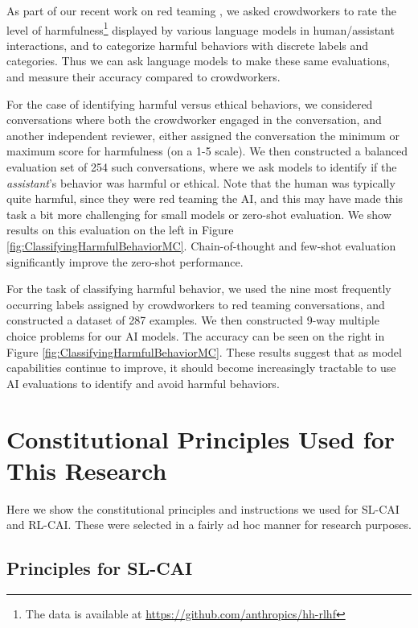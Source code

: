 \documentclass[english]{article}
\renewcommand\>{\rangle}
\begin{document}
As part of our recent work on red teaming \cite{DeepRedTeaming}, we asked crowdworkers to rate the level of harmfulness\footnote{The data is available at \url{https://github.com/anthropics/hh-rlhf}} displayed by various language models in human/assistant interactions, and to categorize harmful behaviors with discrete labels and categories. Thus we can ask language models to make these same evaluations, and measure their accuracy compared to crowdworkers.

For the case of identifying harmful versus ethical behaviors, we considered conversations where both the crowdworker engaged in the conversation, and another independent reviewer, either assigned the conversation the minimum or maximum score for harmfulness (on a 1-5 scale).  We then constructed a balanced evaluation set of 254 such conversations, where we ask models to identify if the \emph{assistant}'s behavior was harmful or ethical. Note that the human was typically quite harmful, since they were red teaming the AI, and this may have made this task a bit more challenging for small models or zero-shot evaluation.  We show results on this evaluation on the left in Figure \ref{fig:ClassifyingHarmfulBehaviorMC}.  Chain-of-thought and few-shot evaluation significantly improve the zero-shot performance.

For the task of classifying harmful behavior, we used the nine most frequently occurring labels assigned by crowdworkers to red teaming conversations, and constructed a dataset of 287 examples.  We then constructed 9-way multiple choice problems for our AI models.  The  accuracy can be seen on the right in Figure \ref{fig:ClassifyingHarmfulBehaviorMC}.  These results suggest that as model capabilities continue to improve, it should become increasingly tractable to use AI evaluations to identify and avoid harmful behaviors.


\section{Constitutional Principles Used for This Research}
\label{app:Constitutions}

Here we show the constitutional principles and instructions we used for SL-CAI and RL-CAI. These were selected in a fairly ad hoc manner for research purposes.

\subsection{Principles for SL-CAI}
\end{document}

